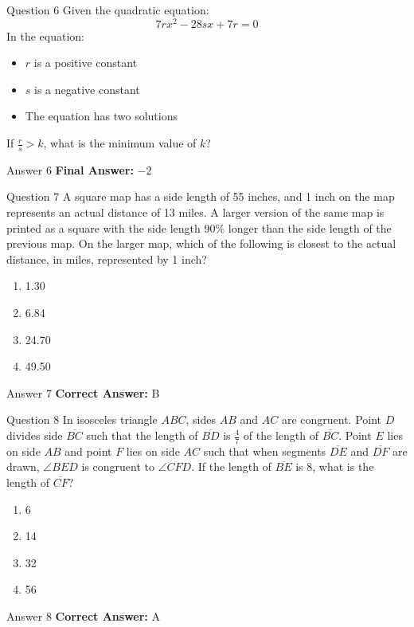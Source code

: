 \documentclass{beamer}
\begin{document}
\begin{frame}{Question 6}
\small
Given the quadratic equation:
\[
7rx^2 - 28sx + 7r = 0
\]
In the equation:

\begin{itemize}
\item \(r\) is a positive constant
\item \(s\) is a negative constant
\item The equation has two solutions
\end{itemize}

If \(\frac{r}{s} > k\), what is the minimum value of \(k\)?
\end{frame}
\begin{frame}{Answer 6}
\small
\textbf{Final Answer:} $\boxed{-2}$
\end{frame}

\begin{frame}{Question 7}
\small
A square map has a side length of 55 inches, and 1 inch on the map represents an actual distance of 13 miles.
A larger version of the same map is printed as a square with the side length 90\% longer than the side length of the previous map.
On the larger map, which of the following is closest to the actual distance, in miles, represented by 1 inch?
\vspace{0.35cm}
\begin{enumerate}
    \item[A.] 1.30
    \item[B.] 6.84
    \item[C.] 24.70
    \item[D.] 49.50
\end{enumerate}
\end{frame}
\begin{frame}{Answer 7}
\small
\textbf{Correct Answer:} B
\end{frame}

\begin{frame}{Question 8}
\small
In isosceles triangle \(ABC\), sides \(AB\) and \(AC\) are congruent.
Point \(D\) divides side \(\overline{BC}\) such that the length of \(\overline{BD}\) is \(\frac{4}{7}\) of the length of \(\overline{BC}\).
Point \(E\) lies on side \(AB\) and point \(F\) lies on side \(AC\) such that when segments \(\overline{DE}\) and \(\overline{DF}\) are drawn, \(\angle BED\) is congruent to \(\angle CFD\).
If the length of \(\overline{BE}\) is 8, what is the length of \(\overline{CF}\)?
\vspace{0.35cm}
\begin{enumerate}
    \item[A.] 6
    \item[B.] 14
    \item[C.] 32
    \item[D.] 56
\end{enumerate}
\end{frame}
\begin{frame}{Answer 8}
\small
\textbf{Correct Answer:} A
\end{frame}
\end{document}
